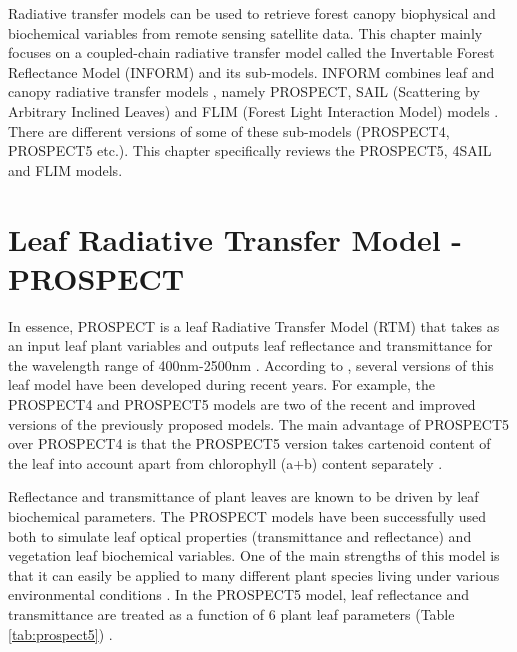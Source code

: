 \documentclass[a4paper, twoside]{templates/ociamthesis}
\begin{document}
Radiative transfer models can be used to retrieve forest canopy biophysical and biochemical variables from remote sensing satellite data. This chapter mainly focuses on a coupled-chain radiative transfer model called the Invertable Forest Reflectance Model (INFORM) and its sub-models. INFORM combines leaf and canopy radiative transfer models \citep{atzberger2000development}, namely PROSPECT, SAIL (Scattering by Arbitrary Inclined Leaves) and FLIM (Forest Light Interaction Model) models \citep{schlerf2006inversion}. There are different versions of some of these sub-models (PROSPECT4, PROSPECT5 etc.). This chapter specifically reviews the PROSPECT5, 4SAIL and FLIM models.

\hypertarget{prospect}{%
\section{Leaf Radiative Transfer Model - PROSPECT}\label{prospect}}

In essence, PROSPECT is a leaf Radiative Transfer Model (RTM) that takes as an input leaf plant variables and outputs leaf reflectance and transmittance for the wavelength range of 400nm-2500nm \citep{jacquemoud1990prospect}. According to \citet{yang2021improving}, several versions of this leaf model have been developed during recent years. For example, the PROSPECT4 and PROSPECT5 models are two of the recent and improved versions of the previously proposed models. The main advantage of PROSPECT5 over PROSPECT4 is that the PROSPECT5 version takes cartenoid content of the leaf into account apart from chlorophyll (a+b) content separately \citep{yang2021improving}.

Reflectance and transmittance of plant leaves are known to be driven by leaf biochemical parameters. The PROSPECT models have been successfully used both to simulate leaf optical properties (transmittance and reflectance) and vegetation leaf biochemical variables. One of the main strengths of this model is that it can easily be applied to many different plant species living under various environmental conditions \citep{yang2021improving}. In the PROSPECT5 model, leaf reflectance and transmittance are treated as a function of 6 plant leaf parameters (Table \ref{tab:prospect5}) \citep{jacquemoud2019leaf}.
\end{document}
